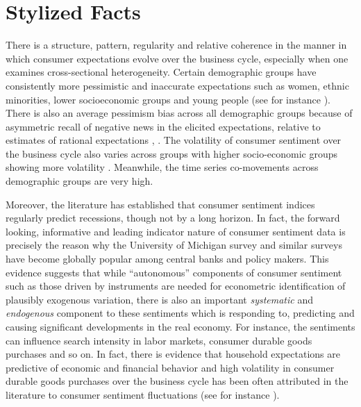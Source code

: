 \documentclass[12pt]{article}
\newcommand{\1}{\mathbbm 1}
\begin{document}
		
		
		
		
		
		
		
		
		
		\section{Stylized Facts} 
		
		
		
		 There is a structure, pattern, regularity and relative coherence in the manner in which consumer expectations evolve over the business cycle, especially when one examines cross-sectional heterogeneity. Certain demographic groups have consistently more pessimistic and inaccurate expectations such as women, ethnic minorities, lower socioeconomic groups and young people (see for instance \cite{madeira2015heterogeneous, curtin19}). There is also an average pessimism bias across all demographic groups because of asymmetric recall of negative news in the elicited expectations, relative to estimates of rational expectations \cite{curtin19}, \cite{bhandari2019survey}. The volatility of consumer sentiment over the business cycle also varies across groups with higher socio-economic groups showing more volatility \cite{curtin19}. Meanwhile, the time series co-movements across demographic groups are very high. 
		 
		 Moreover, the literature has established that consumer sentiment indices regularly predict recessions, though not by a long horizon. In fact, the forward looking, informative and leading indicator nature of consumer sentiment data is precisely the reason why the University of Michigan survey and similar surveys have become globally popular among central banks and policy makers. This evidence suggests that while ``autonomous'' components of consumer sentiment such as those driven by instruments are needed for econometric identification of plausibly exogenous variation, there is also an important \textit{systematic} and \textit{endogenous} component to these sentiments which is responding to, predicting and causing significant developments in the real economy. For instance, the sentiments can influence search intensity in labor markets, consumer durable goods purchases and so on. In fact, there is evidence that household expectations are predictive of economic and financial behavior \cite{armantier2015inflation, armona2018home} and high volatility in consumer durable goods purchases over the business cycle has been often attributed in the literature to consumer sentiment fluctuations (see for instance \cite{katona1960powerful, mishkin1978consumer}).
		 
\end{document}
